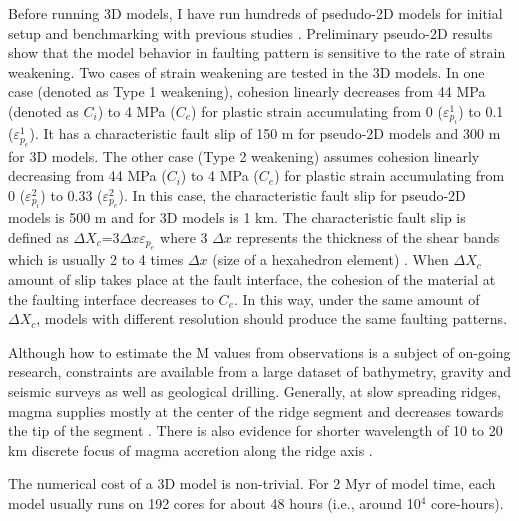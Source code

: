 Before running 3D models, I have run hundreds of psedudo-2D models for initial setup and benchmarking with previous studies \citep[e.g.,][]{Buck2005, Tucholke2008}. Preliminary pseudo-2D results show that the model behavior in faulting pattern is sensitive to the rate of strain weakening. Two cases of strain weakening are tested in the 3D models. In one case (denoted as Type 1 weakening), cohesion linearly decreases from 44 MPa (denoted as $C_{i}$) to 4 MPa ($C_{e}$) for plastic strain accumulating from 0 ($\varepsilon_{p_{i}}^{1}$) to 0.1 ($\varepsilon_{p_{e}}^{1}$). It has a characteristic fault slip of 150 m for pseudo-2D models and 300 m for 3D models. The other case (Type 2 weakening) assumes cohesion linearly decreasing from 44 MPa ($C_{i}$) to 4 MPa ($C_{e}$) for plastic strain accumulating from 0 ($\varepsilon_{p_{i}}^{2}$) to 0.33 ($\varepsilon_{p_{e}}^{2}$). In this case, the characteristic fault slip for pseudo-2D models is 500 m and for 3D models is 1 km. The characteristic fault slip is defined as $\Delta X_{c}$=3$\Delta x \varepsilon_{p_{e}}$ where 3 $\Delta x$ represents the thickness of the shear bands which is usually 2 to 4 times $\Delta x$ (size of a hexahedron element) \citep{Lavier2000}. When $\Delta X_{c}$ amount of slip takes place at the fault interface, the cohesion of the material at the faulting interface decreases to $C_{e}$. In this way, under the same amount of $\Delta X_{c}$, models with different resolution should produce the same faulting patterns. 

Although how to estimate the M values from observations is a subject of on-going research, constraints are available from a large dataset of bathymetry, gravity and seismic surveys as well as geological drilling. Generally, at slow spreading ridges, magma supplies mostly at the center of the ridge segment and decreases towards the tip of the segment \citep[e.g.,][]{Tolstoy1993,Chen1999,Carbotte2015}. There is also evidence for shorter wavelength of 10 to 20 km discrete focus of magma accretion along the ridge axis \citep{Lin1990}.

The numerical cost of a 3D model is non-trivial. For 2 Myr of model time, each model usually runs on 192 cores for about 48 hours (i.e., around 10$^{4}$ core-hours).  %

